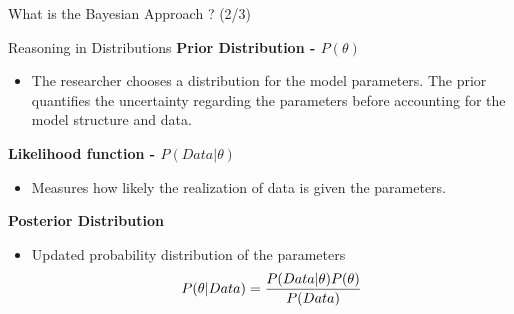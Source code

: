 \documentclass{beamer}
\begin{document}
\begin{frame}{What is the Bayesian Approach ? (2/3)}  
\vspace{-0.3cm}
\begin{simplebox}{Reasoning in Distributions}  
\small %
\textbf{Prior Distribution - $P(\theta)$}  
\begin{itemize}\setlength{\itemsep}{0pt} %
        \item \footnotesize The researcher chooses a distribution for the model parameters. The prior quantifies the uncertainty regarding the parameters before accounting for the model structure and data. 
\end{itemize}  
  
\textbf{Likelihood function - $P(Data|\theta)$}  
\begin{itemize}\setlength{\itemsep}{0pt}  
    \item \footnotesize Measures how likely the realization of data is given the parameters.
\end{itemize}  
  
\textbf{Posterior Distribution}  
\begin{itemize}\setlength{\itemsep}{0pt}  
    \item \footnotesize Updated probability distribution of the parameters
    $$\scriptsize P(\theta|Data) = \frac{P(Data|\theta)P(\theta)}{P(Data)} $$
\end{itemize}  
\end{simplebox}  
\end{frame}  
\end{document}
